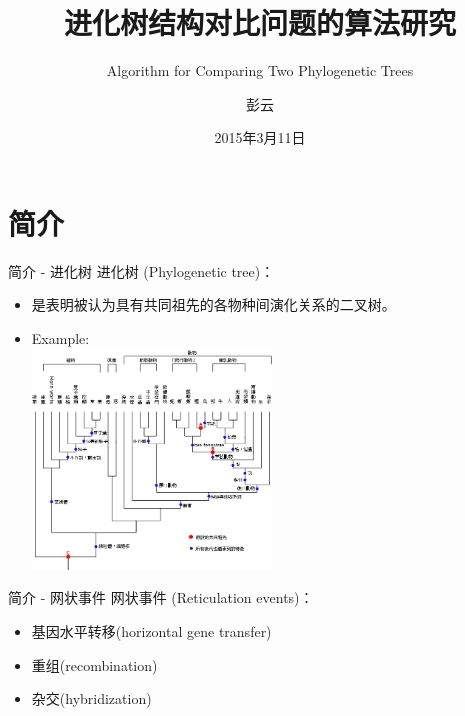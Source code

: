 \documentclass[slidestop,compress,mathserif,red]{beamer}
\begin{document}
\title{进化树结构对比问题的算法研究}
\subtitle{Algorithm for Comparing Two Phylogenetic Trees}
\author{彭云}
\date{2015年3月11日}

\frame{\titlepage}

\section{简介}
\begin{frame}{简介 - 进化树}
    进化树 (Phylogenetic tree)：
    \begin{itemize}
      \item 是表明被认为具有共同祖先的各物种间演化关系的二叉树。
      \pause
      \item Example: \\
      \includegraphics[width=0.5\textwidth, height=0.85\textheight, keepaspectratio]{./pic/Phylogenetic_tree_Chinese.jpg}
    \end{itemize}
\end{frame}

\begin{frame}{简介 - 网状事件}
    网状事件 (Reticulation events)：
    \begin{itemize}
      \item 基因水平转移(horizontal gene transfer)
      \item 重组(recombination)
      \item 杂交(hybridization)
    \end{itemize}
\end{frame}
\end{document}
